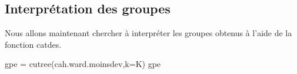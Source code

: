 \documentclass[
]{article}
\newenvironment{Shaded}{}{}
\newcommand{\AttributeTok}[1]{#1}
\newcommand{\FunctionTok}[1]{#1}
\newcommand{\NormalTok}[1]{#1}
\newcommand{\OtherTok}[1]{\textcolor[rgb]{1.00,0.25,0.00}{#1}}
\begin{document}
\hypertarget{interpruxe9tation-des-groupes-1}{%
\subsection{Interprétation des
groupes}\label{interpruxe9tation-des-groupes-1}}

Nous allons maintenant chercher à interpréter les groupes obtenus à
l'aide de la fonction catdes.

\begin{Shaded}
\begin{Highlighting}[]
\NormalTok{gpe }\OtherTok{=} \FunctionTok{cutree}\NormalTok{(cah.ward.moinsdev,}\AttributeTok{k=}\NormalTok{K)}
\NormalTok{gpe}
\end{Highlighting}
\end{Shaded}
\end{document}
